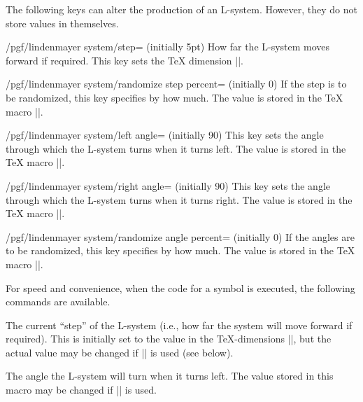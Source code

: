 \begin{command}{\pgfdeclarelindenmayersystem{}}
\begin{command}{\symbol{}}
The following keys can alter the production of an L-system. However,
they do not store values in themselves.

\begin{key}{/pgf/lindenmayer system/step= (initially 5pt)}
  How far the L-system moves forward if required. This key sets the
  \TeX{} dimension |\pgflsystemstep|.
\end{key}

\begin{key}{/pgf/lindenmayer system/randomize step percent= (initially 0)}
  If the step is to be randomized, this key specifies by how much.
  The value is stored in the \TeX{} macro |\pgflsystemrandomizesteppercent|.
\end{key}

\begin{key}{/pgf/lindenmayer system/left angle= (initially 90)}
  This key sets the angle through which the L-system turns when it
  turns left.
  The value is stored in the \TeX{} macro |\pgflsystemrleftangle|.
\end{key}

\begin{key}{/pgf/lindenmayer system/right angle= (initially 90)}
  This key sets the angle through which the L-system turns when it
  turns right.
  The value is stored in the \TeX{} macro |\pgflsystemrrightangle|.
\end{key}

\begin{key}{/pgf/lindenmayer system/randomize angle percent= (initially 0)}
  If the angles are to be randomized, this key specifies by how much.
  The value is stored in the \TeX{} macro |\pgflsystemrandomizeanglepercent|.
\end{key}

For speed and convenience, when the code for a symbol is executed, the
following commands are available.

\begin{command}{\pgflsystemcurrentstep}
	The current ``step'' of the L-system (i.e., how far the system
	will move forward if required). This is initially set to the
	value in the \TeX-dimensions |\pgflsystemstep|, but the actual
	value may be changed if |\pgflsystemrandomizestep| is used
	(see below).
\end{command}

\begin{command}{\pgflsystemcurrentleftangle}
	The angle the L-system will turn when it turns left.
	The value stored in this macro may be changed if
	|\pgflsystemrandomizeleftangle| is used.
\end{command}


\end{command}
\end{command}

